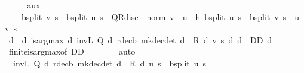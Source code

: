 \begin{isabellebody}
%
\isadelimproof
%
\endisadelimproof
%
\isatagproof
{}\isamarkupfalse%
\ {\isacharminus}{\kern0pt}\isanewline
\ \ \isamarkupfalse%
\ aux{\isacharcolon}{\kern0pt}\isanewline
\ \ \ \ {\isachardoublequoteopen}{\isasymL}\isactrlsub b{\isacharunderscore}{\kern0pt}split\ v\ s\ {\isacharminus}{\kern0pt}\ {\isasymL}\isactrlsub b{\isacharunderscore}{\kern0pt}split\ u\ s\ {\isasymle}\ QR{\isacharunderscore}{\kern0pt}disc\ {\isacharasterisk}{\kern0pt}\ norm\ {\isacharparenleft}{\kern0pt}v\ {\isacharminus}{\kern0pt}\ u{\isacharparenright}{\kern0pt}{\isachardoublequoteclose}\ \ h{\isacharcolon}{\kern0pt}\ {\isachardoublequoteopen}{\isasymL}\isactrlsub b{\isacharunderscore}{\kern0pt}split\ u\ s\ {\isasymle}\ {\isasymL}\isactrlsub b{\isacharunderscore}{\kern0pt}split\ v\ s{\isachardoublequoteclose}\ \ u\ v\ s\isanewline
\ \ \isamarkupfalse%
\ {\isacharminus}{\kern0pt}\isanewline
\ \ \ \ \isamarkupfalse%
\ d\ \ d{\isacharcolon}{\kern0pt}\ {\isachardoublequoteopen}is{\isacharunderscore}{\kern0pt}arg{\isacharunderscore}{\kern0pt}max\ {\isacharparenleft}{\kern0pt}{\isasymlambda}d{\isachardot}{\kern0pt}\ inv\isactrlsub L\ {\isacharparenleft}{\kern0pt}Q\ d{\isacharparenright}{\kern0pt}\ {\isacharparenleft}{\kern0pt}r{\isacharunderscore}{\kern0pt}dec\isactrlsub b\ {\isacharparenleft}{\kern0pt}mk{\isacharunderscore}{\kern0pt}dec{\isacharunderscore}{\kern0pt}det\ d{\isacharparenright}{\kern0pt}\ {\isacharplus}{\kern0pt}\ R\ d\ v{\isacharparenright}{\kern0pt}\ s{\isacharparenright}{\kern0pt}\ {\isacharparenleft}{\kern0pt}{\isasymlambda}d{\isachardot}{\kern0pt}\ d\ {\isasymin}\ D\isactrlsub D{\isacharparenright}{\kern0pt}\ d{\isachardoublequoteclose}\isanewline
\ \ \ \ \ \ \isamarkupfalse%
\ finite{\isacharunderscore}{\kern0pt}is{\isacharunderscore}{\kern0pt}arg{\isacharunderscore}{\kern0pt}max{\isacharbrackleft}{\kern0pt}of\ {\isachardoublequoteopen}D\isactrlsub D{\isachardoublequoteclose}{\isacharbrackright}{\kern0pt}\isanewline
\ \ \ \ \ \ \isamarkupfalse%
\ auto\isanewline
\ \ \ \ \isamarkupfalse%
\ {\isacharasterisk}{\kern0pt}{\isacharcolon}{\kern0pt}\ {\isachardoublequoteopen}inv\isactrlsub L\ {\isacharparenleft}{\kern0pt}Q\ d{\isacharparenright}{\kern0pt}\ {\isacharparenleft}{\kern0pt}r{\isacharunderscore}{\kern0pt}dec\isactrlsub b\ {\isacharparenleft}{\kern0pt}mk{\isacharunderscore}{\kern0pt}dec{\isacharunderscore}{\kern0pt}det\ d{\isacharparenright}{\kern0pt}\ {\isacharplus}{\kern0pt}\ R\ d\ u{\isacharparenright}{\kern0pt}\ s\ {\isasymle}\ {\isasymL}\isactrlsub b{\isacharunderscore}{\kern0pt}split\ u\ s{\isachardoublequoteclose}\isanewline

\end{isabellebody}
